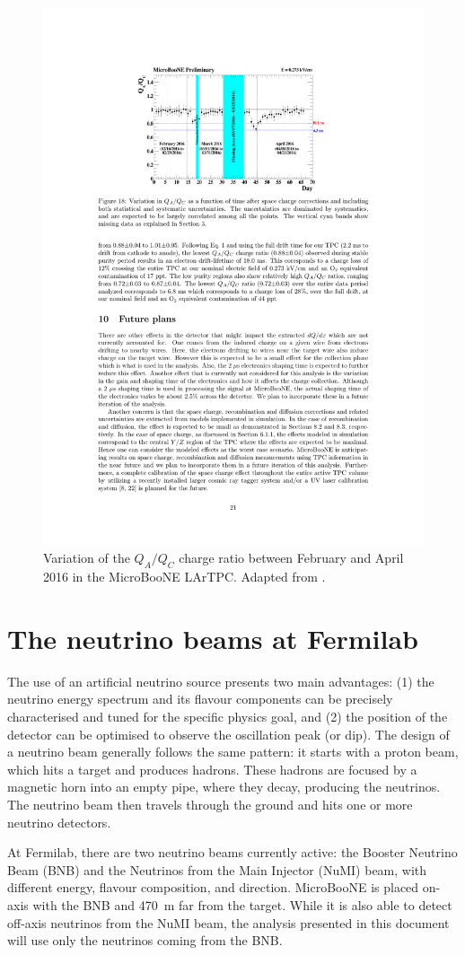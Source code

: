 \begin{figure}[htbp]
    \centering
    \includegraphics[width=0.7\linewidth]{figures/purity.pdf}
    \caption{Variation of the $Q_A/Q_C$ charge ratio between February and April 2016 in the MicroBooNE LArTPC. Adapted from \cite{Meddage:2017lxo}.}
    \label{fig:purity}
\end{figure}
 
\section{The neutrino beams at Fermilab}\label{sec:beam}
The use of an artificial neutrino source presents two main advantages: (1) the neutrino energy spectrum and its flavour components can be precisely characterised and tuned for the specific physics goal, and (2) the position of the detector can be optimised to observe the oscillation peak (or dip). The design of a neutrino beam generally follows the same pattern: it starts with a proton beam, which hits a target and produces hadrons. These hadrons are focused by a magnetic horn into an empty pipe, where they decay, producing the neutrinos. The neutrino beam then travels through the ground and hits one or more neutrino detectors.

At Fermilab, there are two neutrino beams currently active: the Booster Neutrino Beam (BNB) and the Neutrinos from the Main Injector (NuMI) beam, with different energy, flavour composition, and direction. MicroBooNE is placed on-axis with the BNB and 470~m far from the target. While it is also able to detect off-axis neutrinos from the NuMI beam, the analysis presented in this document will use only the neutrinos coming from the BNB.

